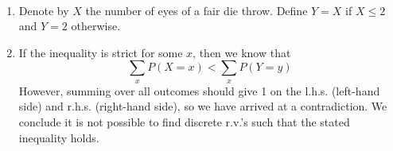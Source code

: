 
\setcounter{theorem}{11}

\begin{exercise} [BH.3.12]
\begin{solution}~
	\begin{enumerate}
		\item Denote by $X$ the number of eyes of a fair die throw. Define $Y=X$ if $X\leq 2$ and $Y=2$ otherwise. 
		\item If the inequality is strict for some $x$, then we know that
		\begin{equation}
			\sum_{x}P(X=x)<\sum_{x}P(Y=y)
		\end{equation}
		However, summing over all outcomes should give 1 on the l.h.s. (left-hand side) and r.h.s. (right-hand side), so we have arrived at a contradiction. We conclude it is not possible to find discrete r.v.'s such that the stated inequality holds.
	\end{enumerate}
\end{solution}
\end{exercise}

